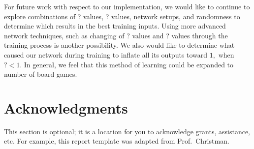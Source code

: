 \documentclass{sig-alternate-05-2015}
\begin{document}
For future work with respect to our implementation, we would like to continue to explore combinations of ? values, ? values, network setups, and randomness to determine which results in the best training inputs. Using more advanced network techniques, such as changing of ? values and ? values through the training process is another possibility. We also would like to determine what caused our network during training to inflate all its outputs toward $1,$ when $? < 1$. In general, we feel that this method of learning could be expanded to number of board games.


\section{Acknowledgments}

This section is optional; it is a location for you to acknowledge grants,
assistance, etc. For example, this report template was adapted from Prof.~Christman.


\end{document}
